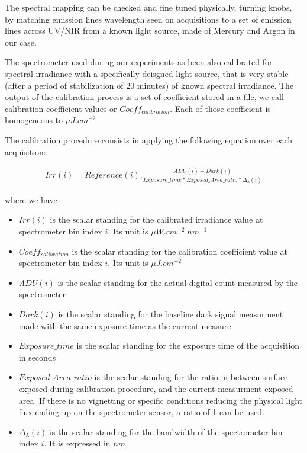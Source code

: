 \documentclass{article}
\begin{document}
    The spectral mapping can be checked and fine tuned physically, turning knobs, by matching emission lines wavelength seen on acquisitions to a set of emission lines across UV/NIR from a known light source, made of Mercury and Argon in our case.
    
    The spectrometer used during our experiments as been also calibrated for spectral irradiance with a specifically deisgned light source, that is very stable (after a period of stabilization of 20 minutes) of known spectral irradiance. The output of the calibration process is a set of coefficient stored in a file, we call calibration coefficient values or $Coeff_{calibration}$. Each of those coefficient is homogeneous to $\mu J . cm^{-2}$
    
    The calibration procedure consists in applying the following equation over each acquisition:
    
    \begin{align*}
     Irr(i) = Reference(i) . \frac{ADU(i)-Dark(i)}{Exposure\_time * Exposed\_Area\_ratio * \Delta_{\lambda}(i)}
    \end{align*}

    where we have
    \begin{itemize}
     \item $Irr(i)$ is the scalar standing for the calibrated irradiance value at spectrometer bin index $i$. Its unit is $\mu W . cm^{-2} . nm^{-1}$
     \item $Coeff_{calibration}$ is the scalar standing for the calibration coefficient value at spectrometer bin index $i$. Its unit is $\mu J . cm^{-2}$
     \item $ADU(i)$ is the scalar standing for the actual digital count measured by the spectrometer
     \item $Dark(i)$ is the scalar standing for the baseline dark signal measurment made with the same exposure time as the current measure
     \item $Exposure\_time$ is the scalar standing for the exposure time of the acquisition in seconds
     \item $Exposed\_Area\_ratio$ is the scalar standing for the ratio in between surface exposed during calibration procedure, and the current measurment exposed area. If there is no vignetting or specific conditions reducing the physical light flux ending up on the spectrometer sensor, a ratio of 1 can be used.
     \item $\Delta_{\lambda}(i)$ is the scalar standing for the bandwidth of the spectrometer bin index $i$. It is expressed in $nm$
    \end{itemize}
\end{document}
